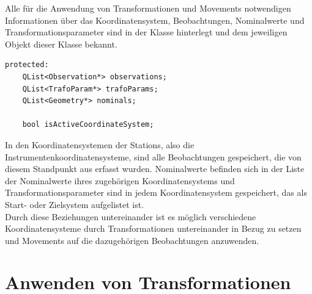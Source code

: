 Alle für die Anwendung von Transformationen und Movements notwendigen Informationen über das Koordinatensystem, Beobachtungen, Nominalwerte und Transformationsparameter sind in der Klasse  hinterlegt und dem jeweiligen Objekt dieser Klasse bekannt.\\
\begin{lstlisting}[caption={Ausschnitt aus coordinatesystem.h},captionpos=t]
protected:
    QList<Observation*> observations;
    QList<TrafoParam*> trafoParams;
    QList<Geometry*> nominals;

    bool isActiveCoordinateSystem;
\end{lstlisting}
In den Koordinatensystemen der Stations, also die Instrumentenkoordinatensysteme, sind alle Beobachtungen gespeichert, die von diesem Standpunkt aus erfasst wurden. Nominalwerte befinden sich in der Liste der Nominalwerte ihres zugehörigen Koordinatensystems und Transformationsparameter sind in jedem Koordinatensystem gespeichert, das als Start- oder Zielsystem aufgelistet ist.\\
Durch diese Beziehungen untereinander ist es möglich verschiedene Koordinatensysteme durch Transformationen untereinander in Bezug zu setzen und Movements auf die dazugehörigen Beobachtungen anzuwenden.

\section{Anwenden von Transformationen}\label{sec:trafoanwendung}

